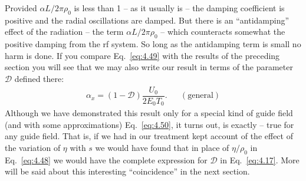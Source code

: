 Provided $\alpha L/2\pi\rho_0$ is less than 1 -- as it usually is -- the damping coefficient
 is positive and the radial oscillations are damped. But there is an ``antidamping'' effect of the radiation -- the term $\alpha L/2\pi\rho_0$ -- which counteracts somewhat the positive damping from the rf system. So long as the antidamping term is small no harm is done.
If you compare Eq.~\eqref{eq:4.49} with the results of the preceding section you will see that we may also write our result in terms of the parameter $\mathscr{D}$ defined there:
\begin{align}\label{eq:4.50}
	\alpha_x = (1-\mathscr{D}) \dfrac{U_0}{2E_0 T_0}. && (\text{general})
\end{align}
Although we have demonstrated this result only for a special kind of guide field (and with some approximations) Eq.~\eqref{eq:4.50}, it turns out, is exactly -- true for any guide field. That is, if we had in our treatment kept account of the effect of the variation of $\eta$ with $s$ we would have found that in place of $\eta/\rho_0$ in Eq.~\eqref{eq:4.48} we would have the complete expression for $\mathscr{D}$ in Eq.~\eqref{eq:4.17}. More will be said about this interesting ``coincidence'' in the next section.
